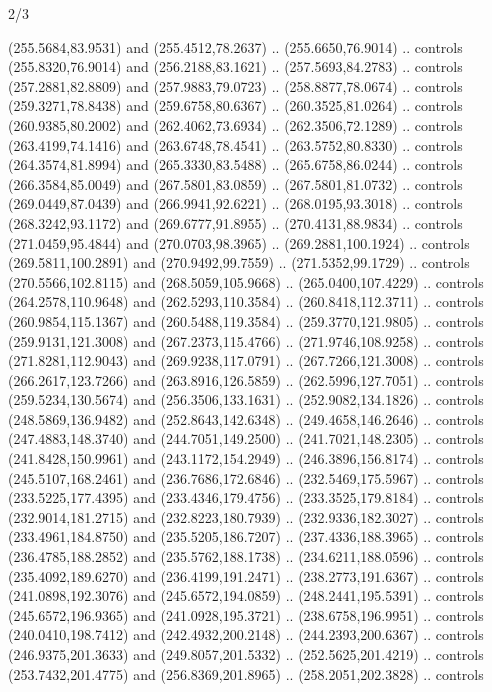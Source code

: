 \begin{flagdescription}{2/3}
\begin{scope}[xshift=0.5\flaglength,yshift=0.5\flagwidth,scale=\flagwidth/240]
\begin{scope}[y=0.8pt, x=0.8pt, yscale=-1,shift={(-225.0,-150)}]
  (255.5684,83.9531) and (255.4512,78.2637) .. (255.6650,76.9014) .. controls
  (255.8320,76.9014) and (256.2188,83.1621) .. (257.5693,84.2783) .. controls
  (257.2881,82.8809) and (257.9883,79.0723) .. (258.8877,78.0674) .. controls
  (259.3271,78.8438) and (259.6758,80.6367) .. (260.3525,81.0264) .. controls
  (260.9385,80.2002) and (262.4062,73.6934) .. (262.3506,72.1289) .. controls
  (263.4199,74.1416) and (263.6748,78.4541) .. (263.5752,80.8330) .. controls
  (264.3574,81.8994) and (265.3330,83.5488) .. (265.6758,86.0244) .. controls
  (266.3584,85.0049) and (267.5801,83.0859) .. (267.5801,81.0732) .. controls
  (269.0449,87.0439) and (266.9941,92.6221) .. (268.0195,93.3018) .. controls
  (268.3242,93.1172) and (269.6777,91.8955) .. (270.4131,88.9834) .. controls
  (271.0459,95.4844) and (270.0703,98.3965) .. (269.2881,100.1924) .. controls
  (269.5811,100.2891) and (270.9492,99.7559) .. (271.5352,99.1729) .. controls
  (270.5566,102.8115) and (268.5059,105.9668) .. (265.0400,107.4229) .. controls
  (264.2578,110.9648) and (262.5293,110.3584) .. (260.8418,112.3711) .. controls
  (260.9854,115.1367) and (260.5488,119.3584) .. (259.3770,121.9805) .. controls
  (259.9131,121.3008) and (267.2373,115.4766) .. (271.9746,108.9258) .. controls
  (271.8281,112.9043) and (269.9238,117.0791) .. (267.7266,121.3008) .. controls
  (266.2617,123.7266) and (263.8916,126.5859) .. (262.5996,127.7051) .. controls
  (259.5234,130.5674) and (256.3506,133.1631) .. (252.9082,134.1826) .. controls
  (248.5869,136.9482) and (252.8643,142.6348) .. (249.4658,146.2646) .. controls
  (247.4883,148.3740) and (244.7051,149.2500) .. (241.7021,148.2305) .. controls
  (241.8428,150.9961) and (243.1172,154.2949) .. (246.3896,156.8174) .. controls
  (245.5107,168.2461) and (236.7686,172.6846) .. (232.5469,175.5967) .. controls
  (233.5225,177.4395) and (233.4346,179.4756) .. (233.3525,179.8184) .. controls
  (232.9014,181.2715) and (232.8223,180.7939) .. (232.9336,182.3027) .. controls
  (233.4961,184.8750) and (235.5205,186.7207) .. (237.4336,188.3965) .. controls
  (236.4785,188.2852) and (235.5762,188.1738) .. (234.6211,188.0596) .. controls
  (235.4092,189.6270) and (236.4199,191.2471) .. (238.2773,191.6367) .. controls
  (241.0898,192.3076) and (245.6572,194.0859) .. (248.2441,195.5391) .. controls
  (245.6572,196.9365) and (241.0928,195.3721) .. (238.6758,196.9951) .. controls
  (240.0410,198.7412) and (242.4932,200.2148) .. (244.2393,200.6367) .. controls
  (246.9375,201.3633) and (249.8057,201.5332) .. (252.5625,201.4219) .. controls
  (253.7432,201.4775) and (256.8369,201.8965) .. (258.2051,202.3828) .. controls

\end{scope}
\end{scope}
\end{flagdescription}
